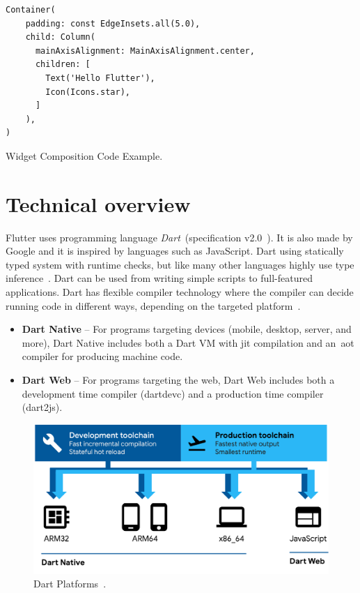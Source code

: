 \begin{listing}[ht]
\begin{verbatim}
Container(
    padding: const EdgeInsets.all(5.0),
    child: Column(
      mainAxisAlignment: MainAxisAlignment.center,
      children: [
        Text('Hello Flutter'),
        Icon(Icons.star),
      ]
    ),
)
\end{verbatim}
\caption{Widget Composition Code Example.}
\label{listing:hello-flutter}
\end{listing}
\section{Technical overview}
Flutter uses programming language \textit{Dart}~(specification v2.0~\cite{dart-specs}). It is also made by Google and it is inspired by languages such as JavaScript. Dart using statically typed system with runtime checks, but like many other languages highly use type inference~\cite{dart-type-system}. Dart can be used from writing simple scripts to full-featured applications. Dart has flexible compiler technology where the compiler can decide running code in different ways, depending on the targeted platform~\cite{dart-platforms}. 

\begin{itemize}
    \item \textbf{Dart Native} -- For programs targeting devices (mobile, desktop, server, and more), Dart Native includes both a Dart VM with \gls{jit} compilation and an~\gls{aot} compiler for producing machine code.
    \item \textbf{Dart Web} -- For programs targeting the web, Dart Web includes both a development time compiler (dartdevc) and a production time compiler (dart2js).
\end{itemize}

\begin{figure}[htp]
    \centering
    \includegraphics[width=0.8\linewidth]{img/flutter/dart-platforms.pdf}
    \caption{Dart Platforms~\cite{dart-platforms}.}
    \label{fig:dart-platform}
\end{figure}


